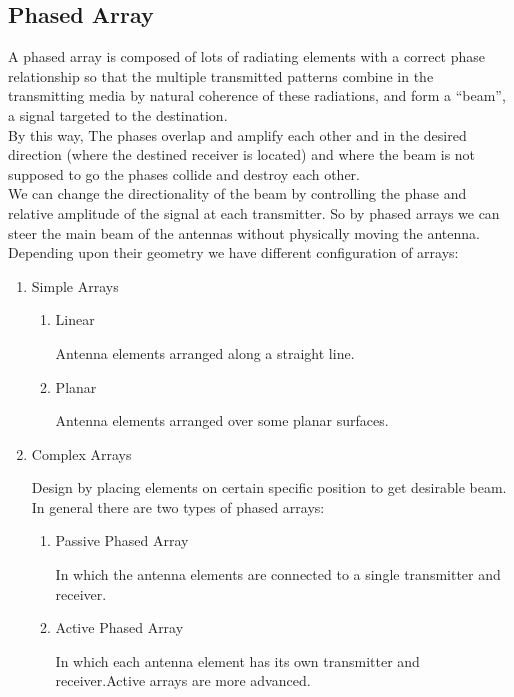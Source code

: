 \subsection{Phased Array}
A phased array is composed of lots of radiating elements with a correct phase relationship so that the multiple transmitted patterns combine in the transmitting media by natural coherence of these radiations, and form a “beam”, a signal targeted to the destination.\\
By this way, The phases overlap and amplify each other and in the desired direction (where the destined receiver is located) and where the beam is not supposed to go the phases collide and destroy each other.\\
We can change the directionality of the beam by controlling the phase and relative amplitude of the signal at each transmitter. So by phased arrays we can steer the main beam of the antennas without physically moving the antenna.\\
Depending upon their geometry we have different configuration of arrays:

\begin{enumerate}

   \item Simple Arrays
      \begin{enumerate}

         \item Linear

            Antenna elements arranged along a straight line.

         \item Planar

            Antenna elements arranged over some planar surfaces.

      \end{enumerate}

   \item Complex Arrays

      Design by placing elements on certain specific position to get desirable beam. In general there are two types of phased arrays:

      \begin{enumerate}

         \item Passive Phased Array

            In which the antenna elements are connected to a single transmitter and receiver.

         \item Active Phased Array

            In which each antenna element has its own transmitter and receiver.Active arrays are more advanced.

      \end{enumerate}

\end{enumerate}

